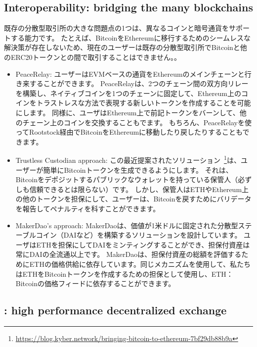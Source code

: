 \subsection{Interoperability: bridging the many blockchains}

既存の分散型取引所の大きな問題点の1つは、異なるコインと暗号通貨をサポートする能力です。 たとえば、BitcoinをEthereumに移行するためのシームレスな解決策が存在しないため、現在のユーザーは既存の分散型取引所でBitcoinと他のERC20トークンとの間で取引することはできません。。

\begin{itemize}

\item PeaceRelay: ユーザーはEVMベースの通貨をEthereumのメインチェーンと行き来することができます。 PeaceRelayは、2つのチェーン間の双方向リレーを構築し、ネイティブコインを1つのチェーンに固定して、Ethereum上のコインをトラストレスな方法で表現する新しいトークンを作成することを可能にします。 同様に、ユーザはEthereum上で前記トークンをバーンして、他のチェーン上のコインを交換することもでます。 もちろん、PeaceRelayを使ってRootstock経由でBitcoinをEthereumに移動したり戻したりすることもできます。

\item Trustless Custodian approach: この最近提案されたソリューション~\footnote{\url{https://blog.kyber.network/bringing-bitcoin-to-ethereum-7bf29db88b9a}}は、ユーザーが簡単にBitcoinトークンを生成できるようにします。 それは、Bitcoinをデポジットするパブリックなウォレットを持っている保管人（必ずしも信頼できるとは限らない）です。 しかし、保管人はETHやEthereum上の他のトークンを担保にして、ユーザーは、Bitcoinを戻すためにバリデータを報告してペナルティを科すことができます。

\item MakerDao’s approach: MakerDaoは、価値が1米ドルに固定された分散型ステーブルコイン（DAIなど）を構築するソリューションを設計しています。 ユーザはETHを担保にしてDAIをミンティングすることができ、担保付資産は常にDAIの全流通以上です。 MakerDaoは、担保付資産の総額を評価するためにETHの価格供給に依存しています。同じメカニズムを使用して、私たちはETHをBitcoinトークンを作成するための担保として使用し、ETH：Bitcoinの価格フィードに依存することができます。
\end{itemize}

\subsection{\codename: high performance decentralized exchange}

